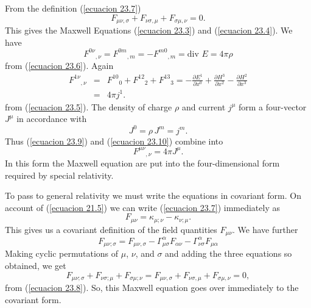 From the definition (\ref{ecuacion 23.7})
\begin{equation}
 \label{ecuacion 23.8}
 F_{\mu\nu,\sigma} + F_{\nu\sigma,\mu} + F_{\sigma\mu,\nu} = 0.
\end{equation}
This gives the Maxwell Equations (\ref{ecuacion 23.3}) and (\ref{ecuacion 23.4}). We have
\begin{equation}
 \label{ecuacion 23.9}
 {F^{0\nu}}_{,\nu} = {F^{0m}}_{,m} = -{F^{m0}}_{,m} = \mbox{div } E = 4 \pi \rho
\end{equation}
from (\ref{ecuacion 23.6}). Again 
\begin{equation}
 \label{ecuacion 23.10}
 \begin{array}{rcl}
 {F^{1\nu}}_{,\nu} & = & {F^{10}}_{0} + {F^{12}}_{2} + {F^{13}}_{3} 
 = -\frac{\partial E^1}{\partial x^0} + \frac{\partial H^{3}}{\partial x^2} - \frac{\partial H^2}{\partial x^3} \\
 & = & 4 \pi j^1.
 \end{array}
\end{equation}
from (\ref{ecuacion 23.5}). The density of charge $\rho$ and current $j^\mu$ form a four-vector $J^\mu$ in accordance 
with
\[
 J^0 = \rho \, J^m = j^m.
\]
Thus (\ref{ecuacion 23.9}) and (\ref{ecuacion 23.10}) combine into
\begin{equation}
 \label{ecuacion 23.11}
 {F^{\mu\nu}}_{,\nu} = 4 \pi J^\mu.
\end{equation}
In this form the Maxwell equation are put into the four-dimensional form required by special relativity.

To pass to general relativity we must write the equations in covariant form. On account of (\ref{ecuacion 21.5}) we can 
write (\ref{ecuacion 23.7}) immediately as 
\[
 F_{\mu\nu} = \kappa_{\mu;\nu} - \kappa_{\nu;\mu}.
\]
This gives us a covariant definition of the field quantities $F_{\mu\nu}$. We have further
\[
 F_{\mu\nu;\sigma} = F_{\mu\nu,\sigma} - \Gamma^\alpha_{\mu\sigma} F_{\alpha\nu} 
                                       - \Gamma^\alpha_{\nu\sigma} F_{\mu\alpha} 
\]
Making cyclic permutations of $\mu$, $\nu$, and $\sigma$ and adding the three equations so obtained, we get
\begin{equation}
 \label{ecuacion 23.12}
   F_{\mu\nu;\sigma} + F_{\nu\sigma;\mu} + F_{\sigma\mu;\nu} 
 = F_{\mu\nu,\sigma} + F_{\nu\sigma,\mu} + F_{\sigma\mu,\nu} = 0,
\end{equation}
from (\ref{ecuacion 23.8}). So, this Maxwell equation goes over immediately to the covariant form.


